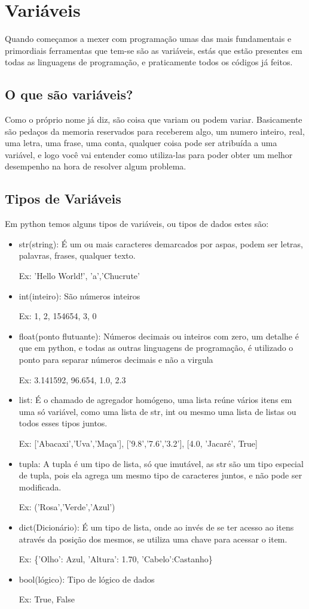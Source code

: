 
\section{Variáveis}
Quando começamos a mexer com programação umas das mais fundamentais e primordiais ferramentas que tem-se são as variáveis, estás que estão presentes em todas as linguagens de programação, e praticamente todos os códigos já feitos.
\subsection{O que são variáveis?}
Como o próprio nome já diz, são coisa que variam ou podem variar. Basicamente são pedaços da memoria reservados para receberem algo, um numero inteiro, real, uma letra, uma frase, uma conta, qualquer coisa pode ser atribuída a uma variável, e logo você vai entender como utiliza-las para poder obter um melhor desempenho na hora de resolver algum problema.
\subsection{Tipos de Variáveis}
Em python temos alguns tipos de variáveis, ou tipos de dados estes são: 
\begin{itemize}
	\item str(string): É um ou mais caracteres demarcados por aspas, podem ser letras, palavras, frases, qualquer texto.
	
	Ex: 'Hello World!', 'a','Chucrute'

	\item int(inteiro): São números inteiros
	
	Ex: 1, 2, 154654, 3, 0
	\item float(ponto flutuante): Números decimais ou inteiros com zero, um detalhe é que em python, e todas as outras linguagens de programação, é utilizado o ponto para separar números decimais e não a virgula
	
	Ex: 3.141592, 96.654, 1.0, 2.3
	\item list: É o chamado de agregador homógeno, uma lista reúne vários itens em uma só variável, como uma lista de str, int ou mesmo uma lista de listas ou todos esses tipos juntos.

	Ex: ['Abacaxi','Uva','Maça'], ['9.8','7.6','3.2'], 	[4.0, 'Jacaré', True]

	\item tupla: A tupla é um tipo de lista, só que imutável, as str são um tipo especial de tupla, pois ela agrega um mesmo tipo de caracteres juntos, e não pode ser modificada.

	Ex: ('Rosa','Verde','Azul')

	\item dict(Dicionário): É um tipo de lista, onde ao invés de se ter acesso ao itens através da posição dos mesmos, se utiliza uma chave para acessar o item.

	Ex:	\{'Olho': Azul, 'Altura': 1.70, 'Cabelo':Castanho\}

	\item bool(lógico): Tipo de lógico de dados

	Ex: True, False
\end{itemize}

